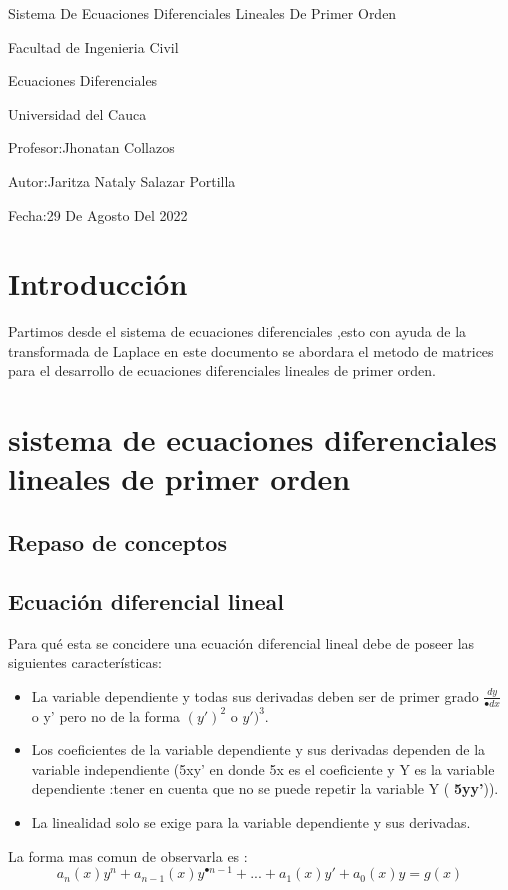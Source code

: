 \documentclass[11.5pt]{article}
\author{Jaritza Nataly Salazar Portilla}
\begin{document}
\begin{titlepage}
\centering
\bfseries\large{Sistema De Ecuaciones Diferenciales Lineales De Primer Orden\par}
\vspace{1cm}
\scshape{Facultad de Ingenieria Civil\par}
\vspace{1cm}
\scshape{Ecuaciones Diferenciales\par}
\vspace{1cm}
\scshape{Universidad del Cauca\par}
\vspace{6cm}
\scshape{Profesor:Jhonatan Collazos\par}
\vspace{1cm}
\scshape{Autor:Jaritza Nataly Salazar Portilla\par}
\vfill
\large{Fecha:29 De Agosto Del 2022}


\vspace{0.5cm}

\end{titlepage}

\pagebreak
\tableofcontents
\pagebreak

\section{Introducción}
Partimos desde el sistema de ecuaciones diferenciales ,esto con ayuda de la transformada de Laplace en este documento se abordara el metodo de matrices para el desarrollo de ecuaciones diferenciales lineales de primer orden.

\section{sistema de ecuaciones diferenciales lineales de primer orden}
\subsection{Repaso de conceptos}
\subsection*{Ecuación diferencial lineal}
Para qué esta se concidere una ecuación diferencial lineal debe de poseer  las siguientes características: \\
 \begin{itemize}
 \item La variable dependiente y todas sus derivadas deben ser de primer grado 
 $\frac{dy}{•dx}$ o y' pero no de la forma $(y')^2$  o  $ y')^3 $.
 \item Los coeficientes de la variable dependiente y sus derivadas dependen de la variable independiente (5xy' en donde 5x es el coeficiente  y Y es la variable dependiente  :tener en cuenta que no se puede repetir la variable Y ( \textbf{5yy'})).
 \item La linealidad solo se exige para la variable dependiente y sus derivadas.
 
 \end{itemize}
La forma mas comun de observarla es   :
$$a_n(x)y^n+a_{n-1}(x)y^{•n-1}+...+a_1(x)y'+a_0(x)y = g(x)$$
\end{document}
